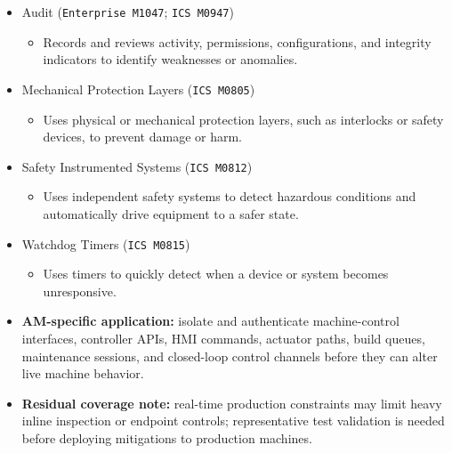 \documentclass[10pt,a4paper,oneside]{report}
\begin{document}
\begin{itemize}
\begin{itemize}
\begin{itemize}
\item Blocks unauthorized or malicious code execution through application control, script blocking, or related controls.
\end{itemize}
\item Audit (\texttt{Enterprise M1047}; \texttt{ICS M0947})
\begin{itemize}
\item Records and reviews activity, permissions, configurations, and integrity indicators to identify weaknesses or anomalies.
\end{itemize}
\item Mechanical Protection Layers (\texttt{ICS M0805})
\begin{itemize}
\item Uses physical or mechanical protection layers, such as interlocks or safety devices, to prevent damage or harm.
\end{itemize}
\item Safety Instrumented Systems (\texttt{ICS M0812})
\begin{itemize}
\item Uses independent safety systems to detect hazardous conditions and automatically drive equipment to a safer state.
\end{itemize}
\item Watchdog Timers (\texttt{ICS M0815})
\begin{itemize}
\item Uses timers to quickly detect when a device or system becomes unresponsive.
\end{itemize}
\end{itemize}
\end{itemize}

\begin{itemize}
\item \textbf{AM-specific application:} isolate and authenticate machine-control interfaces, controller APIs, HMI commands, actuator paths, build queues, maintenance sessions, and closed-loop control channels before they can alter live machine behavior.
\end{itemize}

\begin{itemize}
\item \textbf{Residual coverage note:} real-time production constraints may limit heavy inline inspection or endpoint controls; representative test validation is needed before deploying mitigations to production machines.
\end{itemize}
\end{document}
